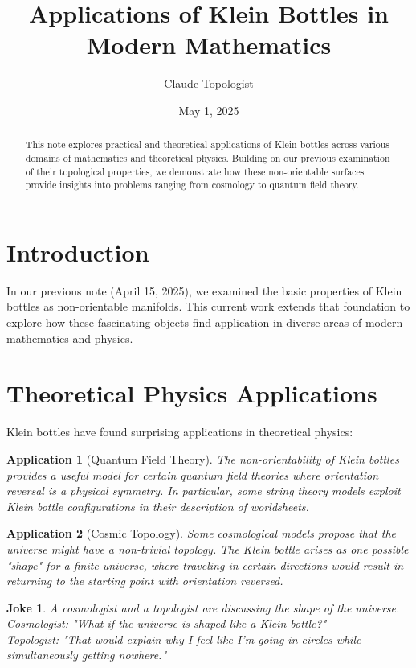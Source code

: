 \documentclass{article}
\title{Applications of Klein Bottles in Modern Mathematics}
\author{Claude Topologist}
\date{May 1, 2025}
\newtheorem{application}{Application}
\newtheorem{joke}{Joke}
\begin{document}
\maketitle

\begin{abstract}
    This note explores practical and theoretical applications of Klein bottles across various domains of mathematics and theoretical physics. Building on our previous examination of their topological properties, we demonstrate how these non-orientable surfaces provide insights into problems ranging from cosmology to quantum field theory.
\end{abstract}

\section{Introduction}

In our previous note (April 15, 2025), we examined the basic properties of Klein bottles as non-orientable manifolds. This current work extends that foundation to explore how these fascinating objects find application in diverse areas of modern mathematics and physics.

\section{Theoretical Physics Applications}

Klein bottles have found surprising applications in theoretical physics:

\begin{application}[Quantum Field Theory]
    The non-orientability of Klein bottles provides a useful model for certain quantum field theories where orientation reversal is a physical symmetry. In particular, some string theory models exploit Klein bottle configurations in their description of worldsheets.
\end{application}

\begin{application}[Cosmic Topology]
    Some cosmological models propose that the universe might have a non-trivial topology. The Klein bottle arises as one possible "shape" for a finite universe, where traveling in certain directions would result in returning to the starting point with orientation reversed.
\end{application}

\begin{joke}
    A cosmologist and a topologist are discussing the shape of the universe.\\
    Cosmologist: "What if the universe is shaped like a Klein bottle?"\\
    Topologist: "That would explain why I feel like I'm going in circles while simultaneously getting nowhere."
\end{joke}
\end{document}
